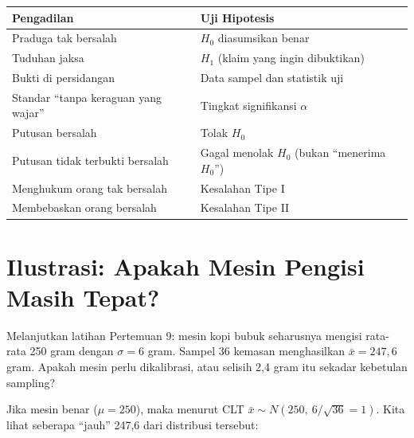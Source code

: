 \documentclass[
  indonesian,
  letterpaper,
]{book}
\newcounter{none} %
\begin{document}
{\def\LTcaptype{none} %
\begin{longtable}[]{@{}
  >{\raggedright\arraybackslash}p{}
  >{\raggedright\arraybackslash}p{}@{}}
\toprule\noalign{}
\begin{minipage}[b]{\linewidth}\raggedright
Pengadilan
\end{minipage} & \begin{minipage}[b]{\linewidth}\raggedright
Uji Hipotesis
\end{minipage} \\
\midrule\noalign{}
\endhead
\bottomrule\noalign{}
\endlastfoot
Praduga tak bersalah & \(H_0\) diasumsikan benar \\
Tuduhan jaksa & \(H_1\) (klaim yang ingin dibuktikan) \\
Bukti di persidangan & Data sampel dan statistik uji \\
Standar ``tanpa keraguan yang wajar'' & Tingkat signifikansi
\(\alpha\) \\
Putusan bersalah & Tolak \(H_0\) \\
Putusan tidak terbukti bersalah & Gagal menolak \(H_0\) (bukan
``menerima \(H_0\)'') \\
Menghukum orang tak bersalah & Kesalahan Tipe I \\
Membebaskan orang bersalah & Kesalahan Tipe II \\
\end{longtable}
}

\section{Ilustrasi: Apakah Mesin Pengisi Masih
Tepat?}\label{ilustrasi-apakah-mesin-pengisi-masih-tepat}

Melanjutkan latihan Pertemuan 9: mesin kopi bubuk seharusnya mengisi
rata-rata 250 gram dengan \(\sigma = 6\) gram. Sampel 36 kemasan
menghasilkan \(\bar{x} = 247{,}6\) gram. Apakah mesin perlu dikalibrasi,
atau selisih 2,4 gram itu sekadar kebetulan sampling?

Jika mesin benar (\(\mu = 250\)), maka menurut CLT
\(\bar{x} \sim N(250,\ 6/\sqrt{36} = 1)\). Kita lihat seberapa ``jauh''
247,6 dari distribusi tersebut:
\end{document}
